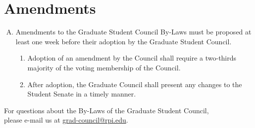 \documentclass[letterpaper,12pt]{article}
\begin{document}
\section{Amendments}
\begin{enumerate}[A.]
	\item Amendments to the Graduate Student Council By-Laws must be proposed at least one week before their adoption by the Graduate Student Council.
	\begin{enumerate}[1.]
		\item Adoption of an amendment by the Council shall require a two-thirds
		majority of the voting membership of the Council.
		\item After adoption, the Graduate Council shall present any changes to the Student Senate in a timely manner.
	\end{enumerate}
\end{enumerate}
\vspace{2cm}
\begin{center}
	For questions about the By-Laws of the Graduate Student Council, \\
	please e-mail us at \href{mailto:grad-council@rpi.edu}{grad-council@rpi.edu}.
\end{center}
\end{document}
